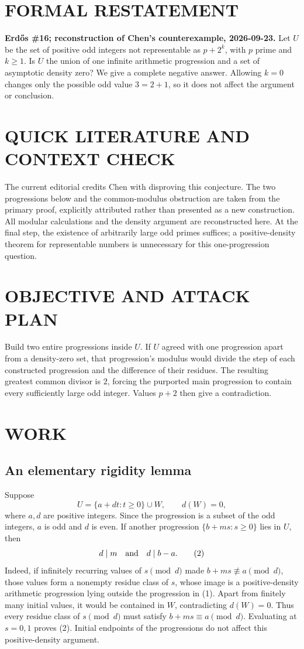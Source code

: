 \section{FORMAL RESTATEMENT}
\textbf{Erd\H{o}s \#16; reconstruction of Chen's counterexample, 2026-09-23.}
Let $U$ be the set of positive odd integers not representable as $p+2^k$, with $p$ prime and $k\ge1$. Is $U$ the union of one infinite arithmetic progression and a set of asymptotic density zero? We give a complete negative answer. Allowing $k=0$ changes only the possible odd value $3=2+1$, so it does not affect the argument or conclusion.

\section{QUICK LITERATURE AND CONTEXT CHECK}
The current editorial credits Chen with disproving this conjecture. The two progressions below and the common-modulus obstruction are taken from the primary proof, explicitly attributed rather than presented as a new construction. All modular calculations and the density argument are reconstructed here. At the final step, the existence of arbitrarily large odd primes suffices; a positive-density theorem for representable numbers is unnecessary for this one-progression question.

\section{OBJECTIVE AND ATTACK PLAN}
Build two entire progressions inside $U$. If $U$ agreed with one progression apart from a density-zero set, that progression's modulus would divide the step of each constructed progression and the difference of their residues. The resulting greatest common divisor is $2$, forcing the purported main progression to contain every sufficiently large odd integer. Values $p+2$ then give a contradiction.

\section{WORK}
\subsection{An elementary rigidity lemma}
Suppose
\[
 U=\{a+dt:t\ge0\}\cup W,\qquad d(W)=0,
\tag{1}
\]
where $a,d$ are positive integers. Since the progression is a subset of the odd integers, $a$ is odd and $d$ is even. If another progression $\{b+ms:s\ge0\}$ lies in $U$, then
\[
 d\mid m\quad\hbox{and}\quad d\mid b-a.
\tag{2}
\]
Indeed, if infinitely recurring values of $s\pmod d$ made $b+ms\not\equiv a\pmod d$, those values form a nonempty residue class of $s$, whose image is a positive-density arithmetic progression lying outside the progression in (1). Apart from finitely many initial values, it would be contained in $W$, contradicting $d(W)=0$. Thus every residue class of $s\pmod d$ must satisfy $b+ms\equiv a\pmod d$. Evaluating at $s=0,1$ proves (2). Initial endpoints of the progressions do not affect this positive-density argument.

